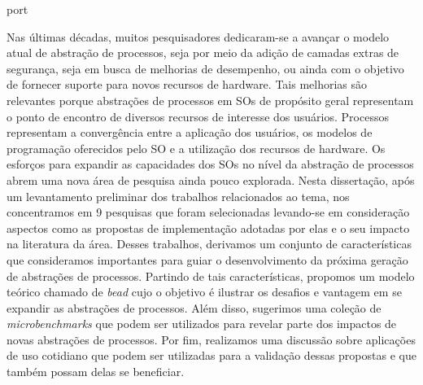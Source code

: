 \begin{resumo}{port}

Nas últimas décadas, muitos pesquisadores dedicaram-se a avançar o modelo atual
de abstração de processos, seja por meio da adição de camadas extras de
segurança, seja em busca de melhorias de desempenho, ou ainda com o objetivo de
fornecer suporte para novos recursos de hardware. Tais melhorias são relevantes
porque abstrações de processos em SOs de propósito geral representam o ponto de
encontro de diversos recursos de interesse dos usuários. Processos representam
a convergência entre a aplicação dos usuários, os modelos de programação
oferecidos pelo SO e a utilização dos recursos de hardware. Os esforços para
expandir as capacidades dos SOs no nível da abstração de processos abrem uma
nova área de pesquisa ainda pouco explorada. Nesta dissertação, após um
levantamento preliminar dos trabalhos relacionados ao tema, nos concentramos em
9 pesquisas que foram selecionadas levando-se em consideração aspectos como as
propostas de implementação adotadas por elas e o seu impacto na literatura da área.
Desses trabalhos, derivamos um conjunto de características que consideramos
importantes para guiar o desenvolvimento da próxima geração de abstrações de
processos. Partindo de tais características, propomos um modelo teórico chamado
de \emph{bead} cujo o objetivo é ilustrar os desafios e vantagem em se expandir
as abstrações de processos. Além disso, sugerimos uma coleção de
\emph{microbenchmarks} que podem ser utilizados para revelar parte dos impactos
de novas abstrações de processos. Por fim, realizamos uma discussão sobre
aplicações de uso cotidiano que podem ser utilizadas para a validação dessas
propostas e que também possam delas se beneficiar.

\end{resumo}

